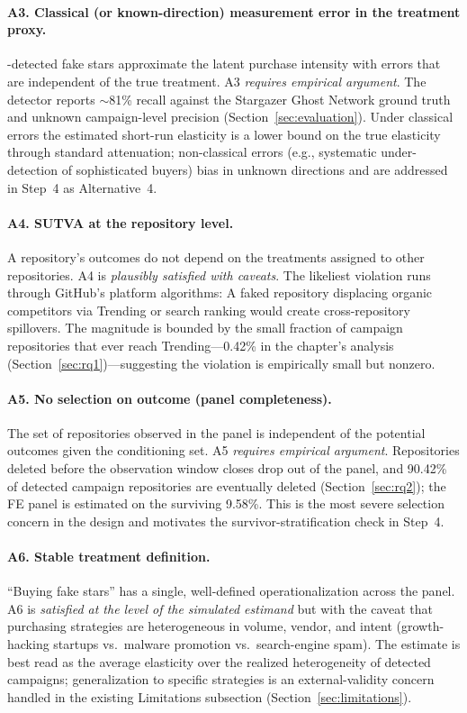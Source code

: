 \paragraph{A3. Classical (or known-direction) measurement error in the treatment proxy.}
\SystemName-detected fake stars approximate the latent purchase intensity with errors that are independent of the true treatment.
A3 \emph{requires empirical argument}.
The detector reports $\sim$81\% recall against the Stargazer Ghost Network ground truth and unknown campaign-level precision (Section~\ref{sec:evaluation}).
Under classical errors the estimated short-run elasticity is a lower bound on the true elasticity through standard attenuation; non-classical errors (e.g., systematic under-detection of sophisticated buyers) bias in unknown directions and are addressed in Step~4 as Alternative~4.

\paragraph{A4. SUTVA at the repository level.}
A repository's outcomes do not depend on the treatments assigned to other repositories.
A4 is \emph{plausibly satisfied with caveats}.
The likeliest violation runs through GitHub's platform algorithms: A faked repository displacing organic competitors via Trending or search ranking would create cross-repository spillovers.
The magnitude is bounded by the small fraction of campaign repositories that ever reach Trending---0.42\% in the chapter's analysis (Section~\ref{sec:rq1})---suggesting the violation is empirically small but nonzero.

\paragraph{A5. No selection on outcome (panel completeness).}
The set of repositories observed in the panel is independent of the potential outcomes given the conditioning set.
A5 \emph{requires empirical argument}.
Repositories deleted before the observation window closes drop out of the panel, and 90.42\% of detected campaign repositories are eventually deleted (Section~\ref{sec:rq2}); the FE panel is estimated on the surviving 9.58\%.
This is the most severe selection concern in the design and motivates the survivor-stratification check in Step~4.

\paragraph{A6. Stable treatment definition.}
``Buying fake stars'' has a single, well-defined operationalization across the panel.
A6 is \emph{satisfied at the level of the simulated estimand} but with the caveat that purchasing strategies are heterogeneous in volume, vendor, and intent (growth-hacking startups vs.\ malware promotion vs.\ search-engine spam).
The estimate is best read as the average elasticity over the realized heterogeneity of detected campaigns; generalization to specific strategies is an external-validity concern handled in the existing Limitations subsection (Section~\ref{sec:limitations}).


